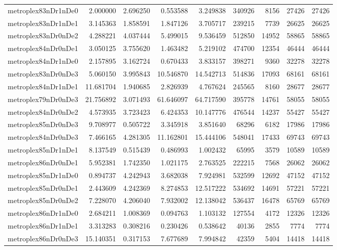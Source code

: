\documentclass[../../../thesis.tex]{subfiles}
\begin{document}
\begin{longtable}{|l|r|r|r|r|r|r|r|r|}
metroplex83nDr1nDe0 & 2.000000 & 2.696250 & 0.553588 & 3.249838 & 340926 & 8156 & 27426 & 27426 \\
metroplex83nDr1nDe1 & 3.145363 & 1.858591 & 1.847126 & 3.705717 & 239215 & 7739 & 26625 & 26625 \\
metroplex83nDr0nDe2 & 4.288221 & 4.037444 & 5.499015 & 9.536459 & 512850 & 14952 & 58865 & 58865 \\
metroplex84nDr0nDe1 & 3.050125 & 3.755620 & 1.463482 & 5.219102 & 474700 & 12354 & 46444 & 46444 \\
metroplex84nDr1nDe0 & 2.157895 & 3.162724 & 0.670433 & 3.833157 & 398271 & 9360 & 32278 & 32278 \\
metroplex83nDr0nDe3 & 5.060150 & 3.995843 & 10.546870 & 14.542713 & 514836 & 17093 & 68161 & 68161 \\
metroplex84nDr1nDe1 & 11.681704 & 1.940685 & 2.826939 & 4.767624 & 245565 & 8160 & 28677 & 28677 \\
metroplex79nDr0nDe3 & 21.756892 & 3.071493 & 61.646097 & 64.717590 & 395778 & 14761 & 58055 & 58055 \\
metroplex84nDr0nDe2 & 4.573935 & 3.723423 & 6.424353 & 10.147776 & 476544 & 14237 & 55427 & 55427 \\
metroplex85nDr0nDe3 & 9.708977 & 0.505722 & 3.345918 & 3.851640 & 68296 & 6182 & 17986 & 17986 \\
metroplex84nDr0nDe3 & 7.466165 & 4.281305 & 11.162801 & 15.444106 & 548041 & 17433 & 69743 & 69743 \\
metroplex85nDr1nDe1 & 8.137549 & 0.515439 & 0.486993 & 1.002432 & 65995 & 3579 & 10589 & 10589 \\
metroplex86nDr0nDe1 & 5.952381 & 1.742350 & 1.021175 & 2.763525 & 222215 & 7568 & 26062 & 26062 \\
metroplex85nDr1nDe0 & 0.894737 & 4.242943 & 3.682038 & 7.924981 & 532599 & 12692 & 47152 & 47152 \\
metroplex85nDr0nDe1 & 2.443609 & 4.242369 & 8.274853 & 12.517222 & 534692 & 14691 & 57221 & 57221 \\
metroplex85nDr0nDe2 & 7.228070 & 4.206040 & 7.932002 & 12.138042 & 536437 & 16478 & 65769 & 65769 \\
metroplex86nDr1nDe0 & 2.684211 & 1.008369 & 0.094763 & 1.103132 & 127554 & 4172 & 12326 & 12326 \\
metroplex86nDr1nDe1 & 3.313283 & 0.308216 & 0.230426 & 0.538642 & 40136 & 2855 & 7774 & 7774 \\
metroplex86nDr0nDe3 & 15.140351 & 0.317153 & 7.677689 & 7.994842 & 42359 & 5404 & 14418 & 14418 \\

\end{longtable}
\end{document}
